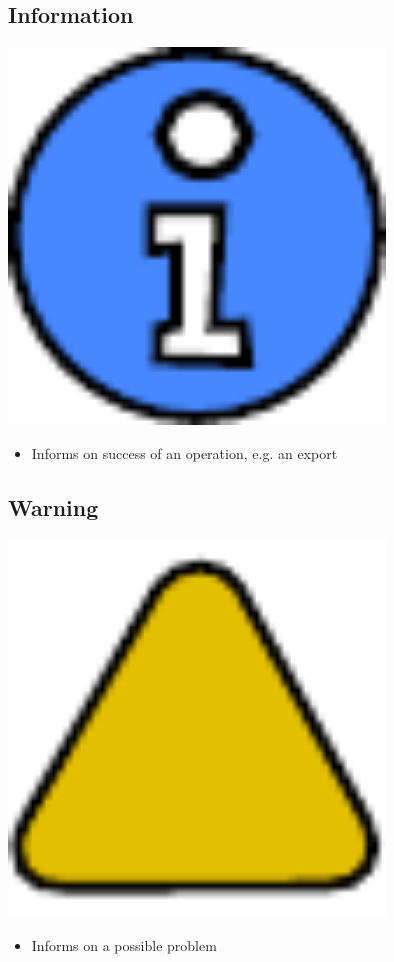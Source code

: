 \subsection{Information}

\includegraphics[width=10cm]{../../gui/source/resources/message_info.pdf}
\begin{itemize}
\item Informs on success of an operation, e.g. an export
\end{itemize}

\subsection{Warning}

\includegraphics[width=10cm]{../../gui/source/resources/message_warn.pdf}
\begin{itemize}
\item Informs on a possible problem
\end{itemize}

